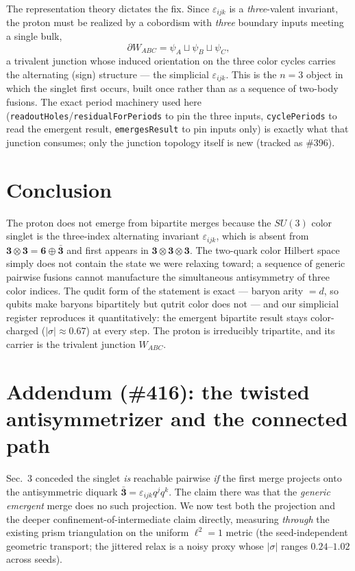 \documentclass[11pt]{article}
\theoremstyle{definition}
\newcommand{\rep}[1]{\mathbf{#1}}      %
\newcommand{\sigmacol}{\sigma}         %
\begin{document}
The representation theory dictates the fix. Since $\varepsilon_{ijk}$ is a
\emph{three}-valent invariant, the proton must be realized by a cobordism with
\emph{three} boundary inputs meeting a single bulk,
\[
  \partial W_{ABC}=\psi_A\sqcup\psi_B\sqcup\psi_C ,
\]
a trivalent junction whose induced orientation on the three color cycles carries
the alternating (sign) structure --- the simplicial $\varepsilon_{ijk}$. This is
the $n=3$ object in which the singlet first occurs, built once rather than as a
sequence of two-body fusions. The exact period machinery used here
(\texttt{readoutHoles}/\texttt{residualForPeriods} to pin the three inputs,
\texttt{cyclePeriods} to read the emergent result, \texttt{emergesResult} to pin
inputs only) is exactly what that junction consumes; only the junction topology
itself is new (tracked as \#396).

\section{Conclusion}

The proton does not emerge from bipartite merges because the $SU(3)$ color
singlet is the three-index alternating invariant $\varepsilon_{ijk}$, which is
absent from $\rep 3\otimes\rep 3=\rep 6\oplus\bar{\rep 3}$ and first appears in
$\rep 3\otimes\rep 3\otimes\rep 3$. The two-quark color Hilbert space simply does
not contain the state we were relaxing toward; a sequence of generic pairwise
fusions cannot manufacture the simultaneous antisymmetry of three color indices.
The qudit form of the statement is exact --- baryon arity $=d$, so qubits make
baryons bipartitely but qutrit color does not --- and our simplicial register
reproduces it quantitatively: the emergent bipartite result stays color-charged
($|\sigmacol|\approx0.67$) at every step. The proton is irreducibly tripartite,
and its carrier is the trivalent junction $W_{ABC}$.

\section{Addendum (\#416): the twisted antisymmetrizer and the connected path}

Sec.~3 conceded the singlet \emph{is} reachable pairwise \emph{if} the first merge
projects onto the antisymmetric diquark $\bar{\rep 3}=\varepsilon_{ijk}q^jq^k$. The
claim there was that the \emph{generic emergent} merge does no such projection. We
now test both the projection and the deeper confinement-of-intermediate claim
directly, measuring \emph{through} the existing prism triangulation on the uniform
$\ell^2=1$ metric (the seed-independent geometric transport; the jittered relax is a
noisy proxy whose $|\sigmacol|$ ranges $0.24$--$1.02$ across seeds).
\end{document}
